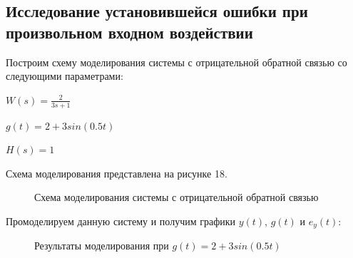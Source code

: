 \documentclass[a4paper, 11pt]{article}
\begin{document}
\newpage
\begin{center}
\section{Исследование установившейся ошибки при произвольном входном воздействии}
\end{center}
\par 
	Построим схему моделирования системы с отрицательной обратной связью со следующими параметрами:
\par 
$\displaystyle W(s)=  \frac{2}{3s+1}$
\par 
$\displaystyle g(t)=2+3sin(0.5t)$
\par 
$H(s)=1$
\par 
Схема моделирования представлена на рисунке 18. 
\begin{figure}[h!]
\caption{Схема моделирования системы с отрицательной обратной связью}
\label{ris:image}
\end{figure}

\par 
Промоделируем данную систему и получим графики $y(t)$, $g(t)$ и $e_y(t)$:

\begin{figure}[h!]
\centering
{}
\caption{Результаты моделирования при $g(t)=2+3sin(0.5t)$}
\end{figure}
\end{document}

